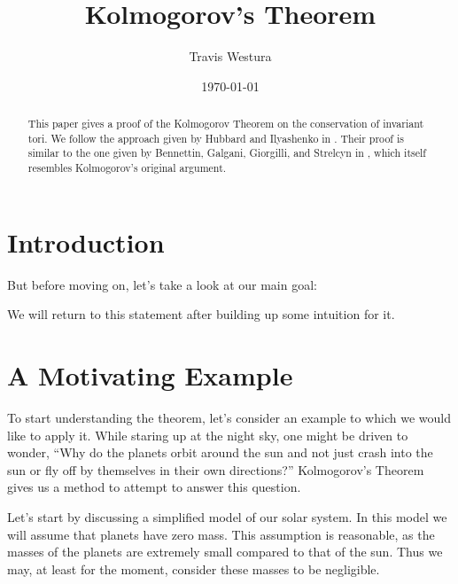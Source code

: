 \documentclass[twoside,letterpaper,10pt]{article}
\title{Kolmogorov's Theorem}
\author{Travis Westura}
\date{\today}
\numberwithin{equation}{section}
\begin{document}
\maketitle

\begin{abstract}
  This paper gives a proof of the Kolmogorov Theorem on the conservation of
  invariant tori.
  We follow the approach given by Hubbard and Ilyashenko in \cite{hi02}.
  Their proof is similar to the one given by Bennettin, Galgani, Giorgilli, and
  Strelcyn in \cite{bggs84}, which itself resembles Kolmogorov's original
  argument.
\end{abstract}


\section{Introduction}
\label{sec:introduction}


But before moving on, let's take a look at our main goal:
\begin{thm}
  \label{thm:KAM}
  \KAM{}
\end{thm}
We will return to this statement after building up some intuition for it.

\section{A Motivating Example}
\label{sec:motivating-example}

To start understanding the theorem, let's consider an example to which we would
like to apply it.
While staring up at the night sky, one might be driven to wonder, ``Why do the
planets orbit around the sun and not just crash into the sun or fly off by
themselves in their own directions?''
Kolmogorov's Theorem gives us a method to attempt to answer this question.

Let's start by discussing a simplified model of our solar system.
In this model we will assume that planets have zero mass.
This assumption is reasonable, as the masses of the planets are extremely small
compared to that of the sun.
Thus we may, at least for the moment, consider these masses to be negligible.
\end{document}
